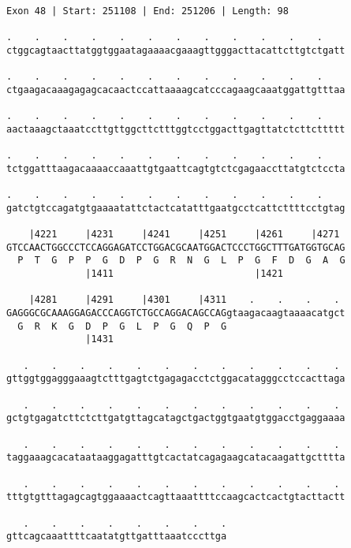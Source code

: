 \documentclass{article}
\begin{document}
\begin{Verbatim}[fontfamily=courier]
Exon 48 | Start: 251108 | End: 251206 | Length: 98

.    .    .    .    .    .    .    .    .    .    .    .    
ctggcagtaacttatggtggaatagaaaacgaaagttgggacttacattcttgtctgatt

.    .    .    .    .    .    .    .    .    .    .    .    
ctgaagacaaagagagcacaactccattaaaagcatcccagaagcaaatggattgtttaa

.    .    .    .    .    .    .    .    .    .    .    .    
aactaaagctaaatccttgttggcttctttggtcctggacttgagttatctcttcttttt

.    .    .    .    .    .    .    .    .    .    .    .    
tctggatttaagacaaaaccaaattgtgaattcagtgtctcgagaaccttatgtctccta

.    .    .    .    .    .    .    .    .    .    .    .    
gatctgtccagatgtgaaaatattctactcatatttgaatgcctcattcttttcctgtag

    |4221     |4231     |4241     |4251     |4261     |4271 
GTCCAACTGGCCCTCCAGGAGATCCTGGACGCAATGGACTCCCTGGCTTTGATGGTGCAG
  P  T  G  P  P  G  D  P  G  R  N  G  L  P  G  F  D  G  A  G
              |1411                         |1421           

    |4281     |4291     |4301     |4311    .    .    .    . 
GAGGGCGCAAAGGAGACCCAGGTCTGCCAGGACAGCCAGgtaagacaagtaaaacatgct
  G  R  K  G  D  P  G  L  P  G  Q  P  G                     
              |1431                                         

   .    .    .    .    .    .    .    .    .    .    .    . 
gttggtggagggaaagtctttgagtctgagagacctctggacatagggcctccacttaga

   .    .    .    .    .    .    .    .    .    .    .    . 
gctgtgagatcttctcttgatgttagcatagctgactggtgaatgtggacctgaggaaaa

   .    .    .    .    .    .    .    .    .    .    .    . 
taggaaagcacataataaggagatttgtcactatcagagaagcatacaagattgctttta

   .    .    .    .    .    .    .    .    .    .    .    . 
tttgtgtttagagcagtggaaaactcagttaaattttccaagcactcactgtacttactt

   .    .    .    .    .    .    .    .
gttcagcaaattttcaatatgttgatttaaatcccttga
\end{Verbatim}
\newpage
\end{document}

